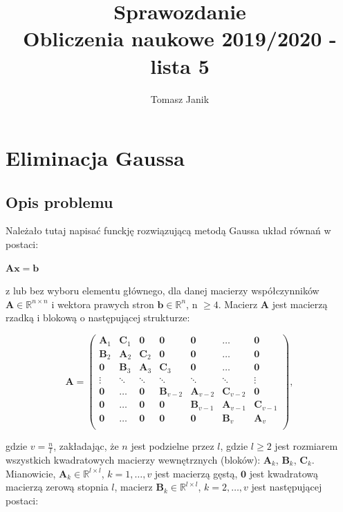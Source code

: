 \documentclass{article}
\title{\textbf{Sprawozdanie}
\\\large Obliczenia naukowe 2019/2020 - lista 5}
\author{Tomasz Janik}
\date{}
\begin{document}
\maketitle
\section{Eliminacja Gaussa}

\subsection{Opis problemu}
Należało tutaj napisać funckję rozwiązującą metodą Gaussa układ równań w postaci:
\begin{center}
    $\mathbf{A}\mathbf{x} = \mathbf{b} $
\end{center}
z lub bez wyboru elementu głównego, dla danej macierzy współczynników $\mathbf{A} \in \mathbb{R}^{n \times n}$ i wektora prawych stron $\mathbf{b} \in \mathbb{R}^{n}$, n $\ge{4}$. Macierz $\mathbf{A}$ jest macierzą rzadką i blokową o następującej strukturze:
\begin{center}
    $$
    \mathbf{A} = 
    \begin{pmatrix}
        \mathbf{A}_{1} & \mathbf{C}_{1} & \mathbf{0} & \mathbf{0} & \mathbf{0} & \ldots & \mathbf{0} \\
        \mathbf{B}_{2} & \mathbf{A}_{2} & \mathbf{C}_{2} & \mathbf{0} & \mathbf{0} & \ldots & \mathbf{0} \\
        \mathbf{0} & \mathbf{B}_{3} & \mathbf{A}_{3} & \mathbf{C}_{3} & \mathbf{0} & \ldots & \mathbf{0} \\
        \vdots & \ddots & \ddots & \ddots & \ddots & \ddots & \vdots \\
        \mathbf{0} & \ldots & \mathbf{0} & \mathbf{B}_{v-2} & \mathbf{A}_{v-2} & \mathbf{C}_{v-2} & \mathbf{0} \\
        \mathbf{0} & \ldots & \mathbf{0} & \mathbf{0} & \mathbf{B}_{v-1} & \mathbf{A}_{v-1} & \mathbf{C}_{v-1} \\
        \mathbf{0} & \ldots & \mathbf{0} & \mathbf{0} & \mathbf{0} & \mathbf{B}_{v} & \mathbf{A}_{v} \\
    \end{pmatrix},
    $$
\end{center}
gdzie $v = \frac{n}{l}$, zakładając, że $n$ jest podzielne przez $l$, gdzie $l \ge{2}$ jest rozmiarem wszystkich kwadratowych macierzy wewnętrznych (bloków): $\mathbf{A}_{k}$, $\mathbf{B}_{k}$, $\mathbf{C}_{k}$. Mianowicie, $\mathbf{A}_{k} \in \mathbb{R}^{l \times l}$, $k = 1, \ldots, v$ jest macierzą gęstą, $\mathbf{0}$ jest kwadratową macierzą zerową stopnia $l$, macierz $\mathbf{B}_{k} \in \mathbb{R}^{l \times l}$, $k = 2, \ldots, v$ jest następującej postaci:
\end{document}
